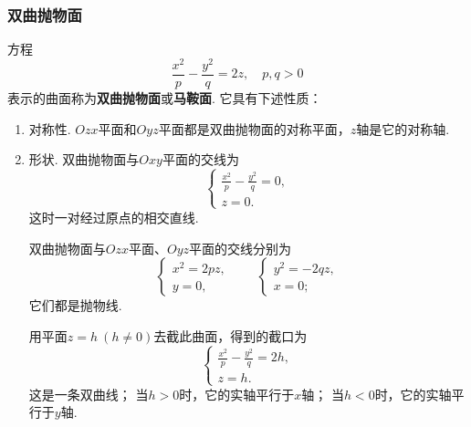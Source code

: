 \subsubsection{双曲抛物面}
方程\begin{equation}\label{equation:解析几何.双曲抛物面的一般方程}
	\frac{x^2}{p}-\frac{y^2}{q}=2z,
	\quad p,q>0
\end{equation}
表示的曲面称为\textbf{双曲抛物面}或\textbf{马鞍面}.
它具有下述性质：
\begin{enumerate}
	\item 对称性.
	\(Ozx\)平面和\(Oyz\)平面都是双曲抛物面的对称平面，\(z\)轴是它的对称轴.

	\item 形状.
	双曲抛物面与\(Oxy\)平面的交线为\[
		\left\{ \begin{array}{l}
			\frac{x^2}{p} - \frac{y^2}{q} = 0, \\
			z = 0.
		\end{array} \right.
	\]
	这时一对经过原点的相交直线.

	双曲抛物面与\(Ozx\)平面、\(Oyz\)平面的交线分别为\[
		\left\{ \begin{array}{l}
			x^2 = 2pz, \\
			y = 0,
		\end{array} \right.
		\qquad
		\left\{ \begin{array}{l}
			y^2 = -2qz, \\
			x = 0;
		\end{array} \right.
	\]
	它们都是抛物线.

	用平面\(z=h\ (h\neq0)\)去截此曲面，得到的截口为\[
		\left\{ \begin{array}{l}
			\frac{x^2}{p} - \frac{y^2}{q} = 2h, \\
			z = h.
		\end{array} \right.
	\]
	这是一条双曲线；
	当\(h>0\)时，它的实轴平行于\(x\)轴；
	当\(h<0\)时，它的实轴平行于\(y\)轴.


\end{enumerate}
